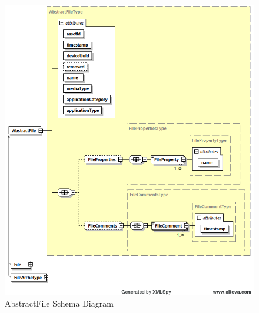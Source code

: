 \begin{figure}[ht]
  \centering
    \includegraphics[width=1.0\textwidth]{figures/AbstractFile Schema.png}
  \caption{AbstractFile Schema Diagram}
  \label{fig:AbstractFile Schema Diagram}
\end{figure}

\FloatBarrier


